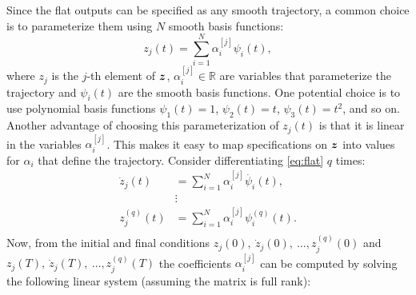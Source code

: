 Since the flat outputs can be specified as any smooth trajectory, a common choice is to parameterize them using $N$ smooth basis functions:
\begin{equation} \label{eq:flat}
z_j(t) = \sum_{i=1}^{N} \alpha_i^{[j]} \psi_i(t),
\end{equation}
where $z_j$ is the $j$-th element of $\bm{z}$, $\alpha_i^{[j]} \in \mathbb{R}$ are variables that parameterize the trajectory and $\psi_i(t)$ are the smooth basis functions. One potential choice is to use polynomial basis functions $\psi_1(t) = 1$, $\psi_2(t) = t$, $\psi_3(t) = t^2$, and so on. Another advantage of choosing this parameterization of $z_j(t)$ is that it is linear in the variables $\alpha_i^{[j]}$. This makes it easy to map specifications on $\bm{z}$ into values for $\alpha_i$ that define the trajectory. Consider differentiating \eqref{eq:flat} $q$ times:
\begin{equation}
\begin{split}
\dot{z}_j(t) &= \sum_{i=1}^{N} \alpha_i^{[j]} \dot{\psi_i}(t), \\
&\vdots \\
z_j^{(q)}(t) &= \sum_{i=1}^{N} \alpha_i^{[j]} \psi_i^{(q)}(t). \\
\end{split}
\end{equation}
Now, from the initial and final conditions $z_j(0), \: \dot{z}_j(0), \: \dots , z_j^{(q)}(0)$ and $z_j(T), \: \dot{z}_j(T), \: \dots , z_j^{(q)}(T)$ the coefficients $\alpha_i^{[j]}$ can be computed by solving the following linear system (assuming the matrix is full rank):
